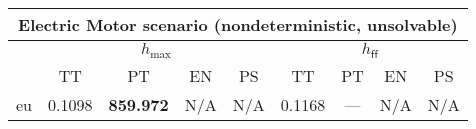 \begin{tabular}{||c||c|c|c|c|c|c|c|c||}%
\multicolumn{9}{c}{\textbf{Electric Motor scenario (nondeterministic, unsolvable)}}\\%
\hline%
&\multicolumn{4}{||c||}{$h_{\max}$}&\multicolumn{4}{||c||}{$h_{\mathsf{ff}}$}\\%
\hline%
&\small{TT}&\small{PT}&\small{EN}&\small{PS}&\small{TT}&\small{PT}&\small{EN}&\small{PS}\\%
\hline%
\hline%
eu&\small{0.1098}&\small{\textbf{859.972}}&\small{N/A}&\small{N/A}&\small{0.1168}&\small{---}&\small{N/A}&\small{N/A}\\%
\hline%
\end{tabular}